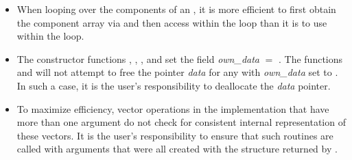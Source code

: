 \begin{itemize}
                                        
\item
  When looping over the components of an  , it is     
  more efficient to first obtain the component array via       
   and then access  within the     
  loop than it is to use  within the loop.        

\item
  The {\nvecs} constructor functions , ,
  , and 
  set the field {\em own\_data} $=$ . 
  The functions  and 
  will not attempt to free the pointer {\em data} for any  with
  {\em own\_data} set to . In such a case, it is the user's responsibility to
  deallocate the {\em data} pointer.
                                     
\item
  To maximize efficiency, vector operations in the {\nvecs} implementation
  that have more than one  argument do not check for
  consistent internal representation of these vectors. It is the user's 
  responsibility to ensure that such routines are called with 
  arguments that were all created with the  structure returned
  by .

\end{itemize}
